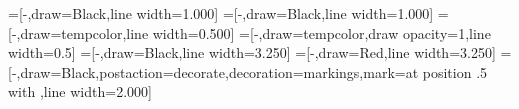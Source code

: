 =[-,draw=Black,line width=1.000]
=[-,draw=Black,line width=1.000]
=[-,draw=tempcolor,line width=0.500]
=[-,draw=tempcolor,draw opacity=1,line width=0.5]
=[-,draw=Black,line width=3.250]
=[-,draw=Red,line width=3.250]
=[-,draw=Black,postaction={decorate},decoration={markings,mark=at position .5 with {\arrow{>}}},line width=2.000]


